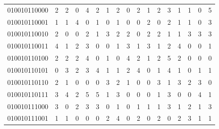 \documentclass[10pt,a4paper]{article}
\begin{document}
\begin{longtable}{ |c|c|c|c|c|c|c|c|c|c|c|c|c|c|c|c|c| }
    010010110000              & 2                            & 2                                & 0                            & 4                              & 2   & 1   & 2   & 0   & 2   & 1   & 2   & 3   & 1   & 1   & 0   & 5   \\
    010010110001              & 1                            & 1                                & 4                            & 0                              & 1   & 0   & 1   & 0   & 0   & 2   & 0   & 2   & 1   & 1   & 0   & 3   \\
    010010110010              & 2                            & 0                                & 0                            & 2                              & 1   & 3   & 2   & 2   & 0   & 2   & 2   & 1   & 1   & 3   & 3   & 3   \\
    010010110011              & 4                            & 1                                & 2                            & 3                              & 0   & 0   & 1   & 3   & 1   & 3   & 1   & 2   & 4   & 0   & 0   & 1   \\
    010010110100              & 2                            & 2                                & 2                            & 4                              & 0   & 1   & 0   & 4   & 2   & 1   & 2   & 5   & 2   & 0   & 0   & 0   \\
    010010110101              & 0                            & 3                                & 2                            & 3                              & 4   & 1   & 1   & 2   & 4   & 0   & 1   & 4   & 1   & 0   & 1   & 1   \\
    010010110110              & 2                            & 1                                & 0                            & 0                              & 0   & 3   & 2   & 1   & 0   & 0   & 3   & 1   & 3   & 2   & 3   & 0   \\
    010010110111              & 3                            & 4                                & 2                            & 5                              & 5   & 1   & 3   & 0   & 0   & 0   & 1   & 3   & 0   & 0   & 4   & 1   \\
    010010111000              & 3                            & 0                                & 2                            & 3                              & 3   & 0   & 1   & 0   & 1   & 1   & 1   & 3   & 1   & 2   & 1   & 3   \\
    010010111001              & 1                            & 1                                & 0                            & 0                              & 0   & 2   & 4   & 0   & 2   & 0   & 2   & 0   & 2   & 3   & 1   & 1   \\

\end{longtable}
\end{document}

